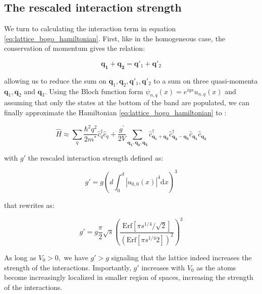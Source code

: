 \subsection{The rescaled interaction strength}

\label{sec:rescaled_interaction}

We turn to calculating the interaction term in equation \ref{eq:lattice_bogo_hamiltonian}. First, like in the homogeneous case, the conservation of momentum gives the relation:

\begin{equation}
    \bm{q_1} + \bm{q_2} = \bm{q}'_1 + \bm{q}'_2
\end{equation}

\noindent allowing us to reduce the sum on $\bm{q}_1,\bm{q}_2, \bm{q}'_1, \bm{q}'_2$ to a sum on three quasi-momenta $\bm{q}_1,\bm{q}_2$ and $\bm{q}_3$. Using the Bloch function form $\psi_{n,q} (x)= e^{iqx} u_{n,q} (x)$ and assuming that only the states at the bottom of the band are populated, we can finally approximate the Hamiltonian \ref{eq:lattice_bogo_hamiltonian} to \cite{dalibard2013cages}:

\begin{equation}
    \hat{H} \approx \sum_{q} \frac{\hbar^{2} q^{2}}{2 m^{*}} \hat{c}_{q}^{\dagger} \hat{c}_{q}+\frac{g^{\prime}}{2 V} \sum_{\bm{q_{1}}, \bm{q_{2}}, \bm{q_{3}}} \hat{c}^{\dagger}_{\bm{q_1}+\bm{q_3}} \hat{c}^{\dagger}_{\bm{q_2}-\bm{q_3}} \hat{c}_{\bm{q_1}} \hat{c}_{\bm{q_2}} 
\end{equation}

\noindent with $g'$ the rescaled interaction strength defined as:

\begin{equation}
    g' = g \left(d \int_0^d |u_{0,0} (x)|^4 \mathrm{d}x \right)^3
\end{equation}

\noindent that rewrites as:

\begin{equation}
    g' = g \frac{\pi}{2} \sqrt{s} \left( \frac{\textrm{Erf} [ \pi s^{1/4} / \sqrt{2}]}{(\textrm{Erf} [ \pi s^{1/4} 2])^2} \right)^3
\end{equation} 

\noindent As long as $V_0 > 0,$ we have $g' > g$ signaling that the lattice indeed increases the strength of the interactions. Importantly, $g'$ increases with $V_0$ as the atoms become increasingly localized in smaller region of spaces, increasing the strength of the interactions.

